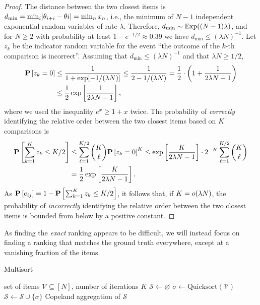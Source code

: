 \begin{proof}
The distance between the two closest items is $d_{\min} = \min_i \lvert\theta_{i+i} - \theta{i}\rvert = \min_n x_n$, i.e., the minimum of $N-1$ independent exponential random variables of rate $\lambda$.
Therefore, $d_{\min} \sim \mathrm{Exp}( (N-1)\lambda )$, and for $N \ge 2$ with probability at least $1 - e^{-1/2} \approx 0.39$ we have $d_{\min} \le (\lambda N)^{-1}$.
Let $z_k$ be the indicator random variable for the event ``the outcome of the $k$-th comparison is incorrect''.
Assuming that $d_{\min} \le (\lambda N)^{-1}$ and that $\lambda N \ge 1/2$,
\begin{align*}
\mathbf{P}\left[ z_k = 0 \right]
    &\le \frac{1}{1 + \exp[-1 / (\lambda N)]} \le \frac{1}{2 - 1/(\lambda N)}
     = \frac{1}{2} \cdot \left( 1 + \frac{1}{2\lambda N - 1} \right) \\
    &\le \frac{1}{2} \exp \left[ \frac{1}{2\lambda N - 1} \right],
\end{align*}
where we used the inequality $e^{x} \ge 1 + x$ twice.
The probability of \emph{correctly} identifying the relative order between the two closest items based on $K$ comparisons is
\begin{align*}
\mathbf{P}\left[ \sum_{k = 1}^K z_k \le K/2 \right]
    &\le \sum_{\ell = 1}^{K/2} \binom{K}{\ell} \mathbf{P}\left[ z_k = 0 \right]^K
     \le \exp \left[ \frac{K}{2\lambda N - 1} \right] \cdot 2^{-K} \sum_{\ell = 1}^{K/2} \binom{K}{\ell} \\
    &= \frac{1}{2} \exp \left[ \frac{K}{2\lambda N - 1} \right].
\end{align*}
As $\mathbf{P}\left[ e_{ij} \right] = 1 - \mathbf{P}\left[ \sum_{k = 1}^K z_k \le K/2 \right]$, it follows that, if $K = o(\lambda N)$, the probability of \emph{incorrectly} identifying the relative order between the two closest items is bounded from below by a positive constant.
\end{proof}

As finding the \emph{exact} ranking appears to be difficult, we will instead focus on finding a ranking that matches the ground truth everywhere, except at a vanishing fraction of the items.

\begin{algorithm}[t]
   \caption{Multisort}
   \label{rs:alg:multisort}
\begin{algorithmic}[1]
   \Require set of items $\mathcal{V} \subseteq [N]$, number of iterations $K$
   \State $\mathcal{S} \gets \varnothing$
     \State $\sigma \gets \text{Quicksort}(\mathcal{V})$
     \State $\mathcal{S} \gets \mathcal{S} \cup \{ \sigma \}$
   \EndFor
   \State \Return Copeland aggregation of $\mathcal{S}$
\end{algorithmic}
\end{algorithm}

